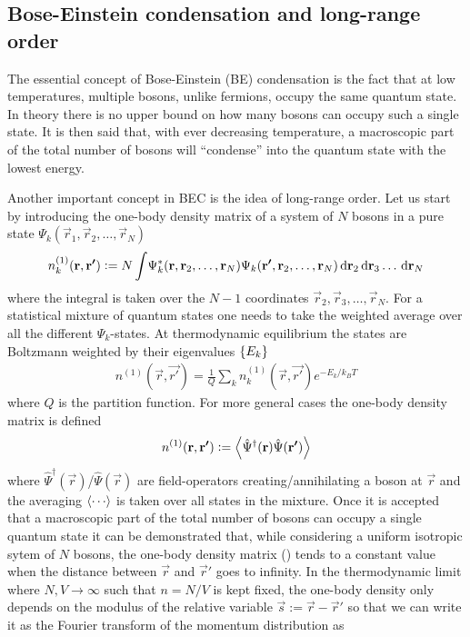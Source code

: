 		\subsection{Bose-Einstein condensation and long-range order}
			The essential concept of Bose-Einstein (BE) condensation is the fact that at low temperatures, multiple bosons, unlike fermions, occupy the same quantum state. In theory there is no upper bound on how many bosons can occupy such a single state. It is then said that, with ever decreasing temperature, a macroscopic part of the total number of bosons will ``condense'' into the quantum state with the lowest energy.		
			
			Another important concept in BEC is the idea of long-range order. Let us start by introducing the one-body density matrix of a system of $N$ bosons in a pure state $\Psi_k(\vec{r}_1,\vec{r}_2,\ldots,\vec{r}_N)$
			\begin{align}
				n^{(1)}_k(\bm{\mathrm{r}},\bm{\mathrm{r'}}) \vcentcolon= N\int\!	\Psi_k^*(\bm{\mathrm{r}},\bm{\mathrm{r}}_2,\ldots,\bm{\mathrm{r}}_N)\Psi_k(\bm{\mathrm{r'}},\bm{\mathrm{r}}_2,\ldots,\bm{\mathrm{r}}_N)\,\mathrm{d}{\bm{\mathrm{r}}}_2\,\mathrm{d}{\bm{\mathrm{r}}}_3\ldots\,\mathrm{d}{\bm{\mathrm{r}}}_N	\label{eq:def-obd-matrix}
			\end{align}
			where the integral is taken over the $N-1$ coordinates $\vec{r}_2,\vec{r}_3,\ldots,\vec{r}_N$. For a statistical mixture of quantum states one needs to take the weighted average over all the different $\Psi_k$-states. At thermodynamic equilibrium the states are Boltzmann weighted by their eigenvalues $\qty{E_k}$
			\begin{align}
				n^{(1)}(\vec{r},\vec{r'}) = \frac{1}{Q}\sum_k n^{(1)}_k(\vec{r},\vec{r'}) \unit{e}^{-E_k/k_BT}
			\end{align}
			where $Q$ is the partition function. For more general cases the one-body density matrix is defined
			\begin{align}
				n^{(1)}(\bm{\mathrm{r}},\bm{\mathrm{r'}}) \vcentcolon=\expval{\hat\Psi^\dagger(\bm{\mathrm{r}})\hat\Psi(\bm{\mathrm{r'}})}
			\end{align}
			where $\hat\Psi^\dagger(\vec{r})$/$\hat\Psi(\vec{r})$ are field-operators creating/annihilating a boson at $\vec{r}$ and the averaging $\expval{\cdots}$ is taken over all states in the mixture. Once it is accepted that a macroscopic part of the total number of bosons can occupy a single quantum state it can be demonstrated that, while considering a uniform isotropic sytem of $N$ bosons, the one-body density matrix () tends to a constant value when the distance between $\vec{r}$ and $\vec{r}'$ goes to infinity. In the thermodynamic limit where $N,V\rightarrow\infty$ such that $n=N/V$ is kept fixed, the one-body density only depends on the modulus of the relative variable $\vec{s}:=\vec{r}-\vec{r}'$ so that we can write it as the Fourier transform of the momentum distribution as
